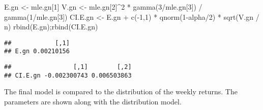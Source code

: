 \documentclass[
]{article}
\newenvironment{Shaded}{\begin{snugshade}}{\end{snugshade}}
\newcommand{\DecValTok}[1]{\textcolor[rgb]{0.00,0.00,0.81}{#1}}
\newcommand{\FunctionTok}[1]{\textcolor[rgb]{0.00,0.00,0.00}{#1}}
\newcommand{\NormalTok}[1]{#1}
\newcommand{\OtherTok}[1]{\textcolor[rgb]{0.56,0.35,0.01}{#1}}
\newcommand{\SpecialCharTok}[1]{\textcolor[rgb]{0.00,0.00,0.00}{#1}}
\begin{document}
\begin{Shaded}
\begin{Highlighting}[]
\NormalTok{E.gn }\OtherTok{\textless{}{-}}\NormalTok{ mle.gn[}\DecValTok{1}\NormalTok{]}
\NormalTok{V.gn }\OtherTok{\textless{}{-}}\NormalTok{ mle.gn[}\DecValTok{2}\NormalTok{]}\SpecialCharTok{\^{}}\DecValTok{2} \SpecialCharTok{*} \FunctionTok{gamma}\NormalTok{(}\DecValTok{3}\SpecialCharTok{/}\NormalTok{mle.gn[}\DecValTok{3}\NormalTok{]) }\SpecialCharTok{/} \FunctionTok{gamma}\NormalTok{(}\DecValTok{1}\SpecialCharTok{/}\NormalTok{mle.gn[}\DecValTok{3}\NormalTok{])}
\NormalTok{CI.E.gn }\OtherTok{\textless{}{-}}\NormalTok{ E.gn }\SpecialCharTok{+} \FunctionTok{c}\NormalTok{(}\SpecialCharTok{{-}}\DecValTok{1}\NormalTok{,}\DecValTok{1}\NormalTok{) }\SpecialCharTok{*} \FunctionTok{qnorm}\NormalTok{(}\DecValTok{1}\SpecialCharTok{{-}}\NormalTok{alpha}\SpecialCharTok{/}\DecValTok{2}\NormalTok{) }\SpecialCharTok{*} \FunctionTok{sqrt}\NormalTok{(V.gn }\SpecialCharTok{/}\NormalTok{ n)}
\FunctionTok{rbind}\NormalTok{(E.gn);}\FunctionTok{rbind}\NormalTok{(CI.E.gn)}
\end{Highlighting}
\end{Shaded}

\begin{verbatim}
##            [,1]
## E.gn 0.00210156
\end{verbatim}

\begin{verbatim}
##                 [,1]        [,2]
## CI.E.gn -0.002300743 0.006503863
\end{verbatim}

The final model is compared to the distribution of the weekly returns.
The parameters are shown along with the distribution model.
\end{document}
